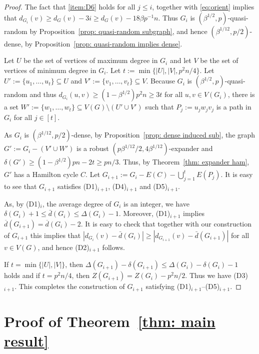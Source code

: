 \documentclass[a4paper, 11pt, reqno]{amsart}
\numberwithin{equation}{section}
\newcommand{\1}{{\rm 1\hspace*{-0.4ex}%
\rule{0.1ex}{1.52ex}\hspace*{0.2ex}}}
\newcommand{\sm}{\setminus}
\begin{document}
\begin{proof}
The fact that \ref{item:D6} holds for all $j\leq i$,
together with
\eqref{eq:orient} implies that $d_{G_i}(v) \geq d_{G}(v)-3i \geq d_{G}(v) - 18 \beta p^{-1} n$. 
Thus $G_i$ is $(\beta^{1/2},p)$-quasi-random by Proposition~\ref{prop: quasi-random subgraph},
and hence $(\beta^{1/12},p/2)$-dense, by Proposition~\ref{prop: quasi-random implies dense}.

Let $U$ be the set of vertices of maximum degree in $G_i$ and let $V$ be the set of vertices of minimum degree in $G_i$. 
Let $t:=\min\{|U|,|V|, p^2 n/4\}$.
Let $U':=\{u_1,\ldots,u_t\}\subseteq U$ and $V':=\{v_1,\ldots,v_t\}\subseteq V$.
Because $G_i$ is $(\beta^{1/2},p)$-quasi-random and thus $d_{G_i}(u,v)\geq (1-\beta^{1/2})p^2 n \geq 3t$ for all $u,v\in V(G_i)$, 
there is a set $W':=\{w_1,\ldots,w_t\}\subseteq V(G)\sm (U'\cup V')$ such that $P_j:=u_jw_jv_j$ is a path in $G_i$ for all $j\in [t]$.

As $G_i$ is $(\beta^{1/12},p/2)$-dense,
by Proposition~\ref{prop: dense induced sub}, the graph $G':=G_i-(V'\cup W')$ is a robust $(p\beta^{1/12}/2,4\beta^{1/12})$-expander 
and $\delta(G')\geq (1-\beta^{1/2})pn - 2t \geq pn/3$. 
Thus, by Theorem~\ref{thm: expander ham}, $G'$ has a Hamilton cycle $C$.
Let $G_{i+1} := G_i - E(C) - \bigcup_{j=1}^{t} E(P_j)$.
It is easy to see that $G_{i+1}$ satisfies (D1)$_{i+1}$,  (D4)$_{i+1}$ and (D5)$_{i+1}$.

As, by (D1)$_{i}$, 
the average degree of $G_i$ is an integer, we have $\delta(G_{i})+1\leq \bar{d}(G_i)\leq \Delta(G_i)-1$. 
Moreover, (D1)$_{i+1}$ implies $\overline{d}(G_{i+1})= \overline{d}(G_i)-2$. 
It is easy to check that together with our construction of $G_{i+1}$ this implies that $|d_{G_i}(v)-\bar{d}(G_i)|\geq |d_{G_{i+1}}(v)-\bar{d}(G_{i+1})|$ for all $v\in V(G)$, 
and hence (D2)$_{i+1}$ follows.

If $t=\min\{|U|,|V|\}$,
then $\Delta(G_{i+1})-\delta(G_{i+1})\leq \Delta(G_i)-\delta(G_i)-1$ holds
and if $t=p^2n/4$,
then $Z(G_{i+1})=Z(G_i)- p^2 n/2$.
Thus we have (D3)$_{i+1}$. 
This completes the construction of $G_{i+1}$ satisfying (D1)$_{i+1}$--(D5)$_{i+1}$.
\end{proof}








\section{Proof of Theorem~\ref{thm: main result}}
\label{sec:final}
\end{document}
